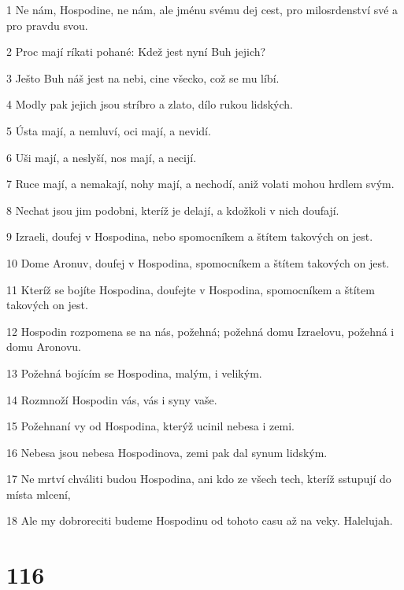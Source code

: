 \par 1 Ne nám, Hospodine, ne nám, ale jménu svému dej cest, pro milosrdenství své a pro pravdu svou.
\par 2 Proc mají ríkati pohané: Kdež jest nyní Buh jejich?
\par 3 Ješto Buh náš jest na nebi, cine všecko, což se mu líbí.
\par 4 Modly pak jejich jsou stríbro a zlato, dílo rukou lidských.
\par 5 Ústa mají, a nemluví, oci mají, a nevidí.
\par 6 Uši mají, a neslyší, nos mají, a necijí.
\par 7 Ruce mají, a nemakají, nohy mají, a nechodí, aniž volati mohou hrdlem svým.
\par 8 Nechat jsou jim podobni, kteríž je delají, a kdožkoli v nich doufají.
\par 9 Izraeli, doufej v Hospodina, nebo spomocníkem a štítem takových on jest.
\par 10 Dome Aronuv, doufej v Hospodina, spomocníkem a štítem takových on jest.
\par 11 Kteríž se bojíte Hospodina, doufejte v Hospodina, spomocníkem a štítem takových on jest.
\par 12 Hospodin rozpomena se na nás, požehná; požehná domu Izraelovu, požehná i domu Aronovu.
\par 13 Požehná bojícím se Hospodina, malým, i velikým.
\par 14 Rozmnoží Hospodin vás, vás i syny vaše.
\par 15 Požehnaní vy od Hospodina, kterýž ucinil nebesa i zemi.
\par 16 Nebesa jsou nebesa Hospodinova, zemi pak dal synum lidským.
\par 17 Ne mrtví chváliti budou Hospodina, ani kdo ze všech tech, kteríž sstupují do místa mlcení,
\par 18 Ale my dobroreciti budeme Hospodinu od tohoto casu až na veky. Halelujah.

\chapter{116}

